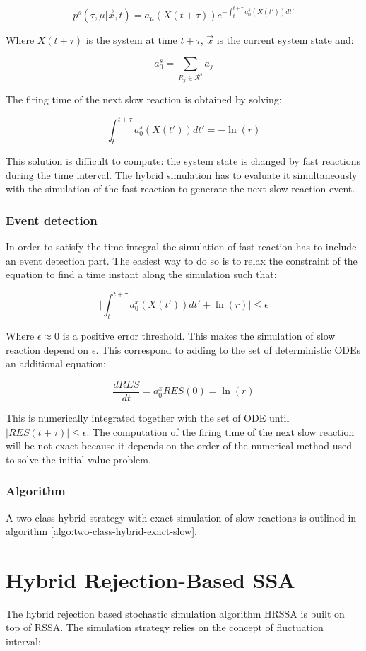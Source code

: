   $$p^s(\tau, \mu|\vec{x}, t) = a_\mu(X(t+\tau))e^{-\int_t^{t+\tau}a_0^s(X(t'))dt'}$$

  Where $X(t+\tau)$ is the system at time $t+\tau$, $\vec{x}$ is the current system state and:

  $$a_0^s = \sum\limits_{R_j\in\mathcal{R}^s}a_j$$

  The firing time of the next slow reaction is obtained by solving:

  $$\int_t^{t+\tau} a_0^s(X(t'))dt' = -\ln(r)$$

  This solution is difficult to compute: the system state is changed by fast reactions during the time interval.
  The hybrid simulation has to evaluate it simultaneously with the simulation of the fast reaction to generate the next slow reaction event.

    \subsubsection{Event detection}
    In order to satisfy the time integral the simulation of fast reaction has to include an event detection part.
    The easiest way to do so is to relax the constraint of the equation to find a time instant along the simulation such that:

    $$\biggr\vert\int_t^{t+\tau}a_0^x(X(t'))dt' + \ln(r)\biggr\vert\le\epsilon$$

    Where $\epsilon\approx 0$ is a positive error threshold.
    This makes the simulation of slow reaction depend on $\epsilon$.
    This correspond to adding to the set of deterministic ODEs an additional equation:

    $$\frac{dRES}{dt} = a_0^xRES(0) = \ln(r)$$

    This is numerically integrated together with the set of ODE until $|RES(t+\tau)|\le\epsilon$.
    The computation of the firing time of the next slow reaction will be not exact because it depends on the order of the numerical method used to solve the initial value problem.

    \subsubsection{Algorithm}
    A two class hybrid strategy with exact simulation of slow reactions is outlined in algorithm \ref{algo:two-class-hybrid-exact-slow}.

    

\section{Hybrid Rejection-Based SSA}
The hybrid rejection based stochastic simulation algorithm HRSSA is built on top of RSSA.
The simulation strategy relies on the concept of fluctuation interval:


